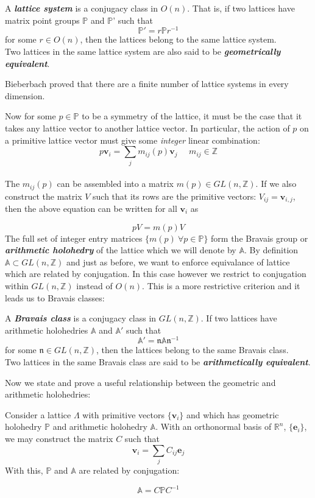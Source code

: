 \documentclass[9 pt]{report}
\def\*#1{\boldsymbol{#1}}
\begin{document}
\\
\\
\begin{tcolorbox}
	A \textbf{\emph{lattice system}} is a conjugacy class in $O(n)$. That is,
	if two lattices have matrix point groups $\mathbb{P}$ and $\mathbb{P}$' such that
	$$ \mathbb{P}'=r\mathbb{P}r^{-1} $$
	for some $r\in O(n)$, then the lattices belong to the same lattice system.
	\\
	Two lattices in the same lattice system are also said to be \textbf{\emph{geometrically equivalent}}.
\end{tcolorbox}
Bieberbach proved that there are a finite number of lattice systems in every dimension.


\newpage

Now for some $p\in\mathbb{P}$ to be a symmetry of the lattice, it must be the case that it takes any lattice vector to another lattice vector. In particular, the action of $p$ on a primitive lattice vector must give some \emph{integer} linear combination:
$$ p\*v_i = \sum_{j}m_{ij}(p)\*v_j \:\:\:\:\:\: m_{ij}\in\mathbb{Z} $$
\\
The $m_{ij}(p)$ can be assembled into a matrix $m(p)\in GL(n, \mathbb{Z})$. If we also construct the matrix $V$ such that its rows are the primitive vectors: $V_{ij} = \*v_{i,j}$, then the above equation can be written for all $\*v_i$ as

$$ pV = m(p)V $$
The full set of integer entry matrices $\{ m(p)\:\forall p\in\mathbb{P}\}$ form the Bravais group or \textbf{\emph{arithmetic holohedry}} of the lattice which we will denote by $\mathbb{A}$. By definition $\mathbb{A}\subset GL(n, \mathbb{Z})$ and just as before, we want to enforce equivalance of lattice which are related by conjugation. In this case however we restrict to conjugation within $GL(n,\mathbb{Z})$ instead of $O(n)$. This is a more restrictive criterion and it leads us to Bravais classes:

\begin{tcolorbox}
	A \textbf{\emph{Bravais class}} is a conjugacy class in $GL(n, \mathbb{Z})$. If two lattices have arithmetic holohedries $\mathbb{A}$ and $\mathbb{A}'$ such that
	$$ \mathbb{A}' = \mathfrak{n}\mathbb{A}\mathfrak{n}^{-1} $$
	for some $\mathfrak{n}\in GL(n, \mathbb{Z})$, then the lattices belong to the same Bravais class.
	\\
	Two lattices in the same Bravais class are said to be \textbf{\emph{arithmetically equivalent}}.
\end{tcolorbox}
Now we state and prove a useful relationship between the geometric and arithmetic holohedries:
\begin{tcolorbox}
	Consider a lattice $\Lambda$ with primitive vectors $\{\*v_i\}$ and which has geometric holohedry $\mathbb{P}$ and arithmetic holohedry $\mathbb{A}$. With an orthonormal basis of $\mathbb{R}^n$, $\{\*e_i\}$, we may construct the matrix $C$ such that
	$$ \*v_i = \sum_j C_{ij}\*e_j $$
	With this, $\mathbb{P}$ and $\mathbb{A}$ are related by conjugation:
	
	$$ \mathbb{A} = C\mathbb{P}C^{-1} $$
	
\end{tcolorbox}
\end{document}
